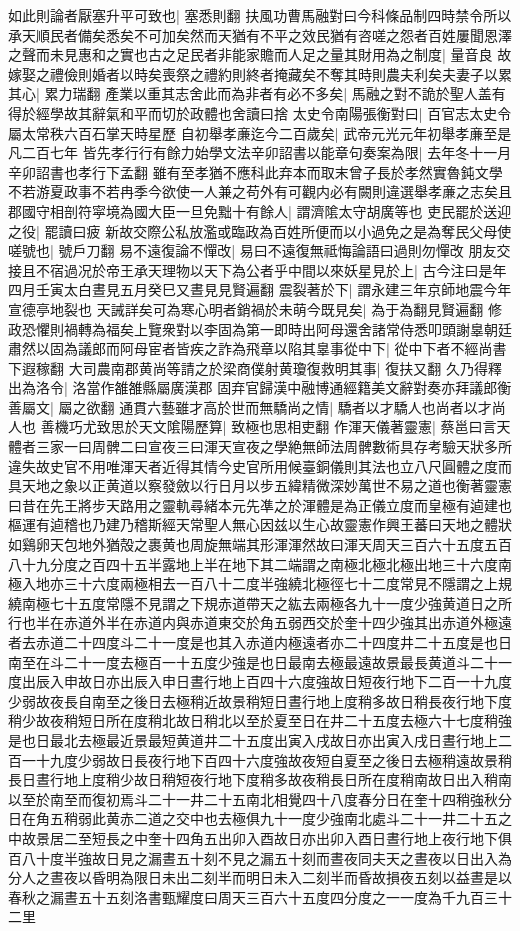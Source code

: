 如此則論者厭塞升平可致也|{
	塞悉則翻}
扶風功曹馬融對曰今科條品制四時禁令所以承天順民者備矣悉矣不可加矣然而天猶有不平之效民猶有咨嗟之怨者百姓屢聞恩澤之聲而未見惠和之實也古之足民者非能家贍而人足之量其財用為之制度|{
	量音良}
故嫁娶之禮儉則婚者以時矣喪祭之禮約則終者掩藏矣不奪其時則農夫利矣夫妻子以累其心|{
	累力瑞翻}
產業以重其志舍此而為非者有必不多矣|{
	馬融之對不詭於聖人盖有得於經學故其辭氣和平而切於政體也舍讀曰捨}
太史令南陽張衡對曰|{
	百官志太史令屬太常秩六百石掌天時星歷}
自初舉孝亷迄今二百歲矣|{
	武帝元光元年初舉孝亷至是凡二百七年}
皆先孝行行有餘力始學文法辛卯詔書以能章句奏案為限|{
	去年冬十一月辛卯詔書也孝行下孟翻}
雖有至孝猶不應科此弃本而取末曾子長於孝然實魯鈍文學不若游夏政事不若冉季今欲使一人兼之苟外有可觀内必有闕則違選舉孝亷之志矣且郡國守相剖符寜境為國大臣一旦免黜十有餘人|{
	謂濟隂太守胡廣等也}
吏民罷於送迎之役|{
	罷讀曰疲}
新故交際公私放濫或臨政為百姓所便而以小過免之是為奪民父母使嗟號也|{
	號戶刀翻}
易不遠復論不憚改|{
	易曰不遠復無祗悔論語曰過則勿憚改}
朋友交接且不宿過况於帝王承天理物以天下為公者乎中間以來妖星見於上|{
	古今注曰是年四月壬寅太白晝見五月癸巳又晝見見賢遍翻}
震裂著於下|{
	謂永建三年京師地震今年宣德亭地裂也}
天誡詳矣可為寒心明者銷禍於未萌今既見矣|{
	為于為翻見賢遍翻}
修政恐懼則禍轉為福矣上覽衆對以李固為第一即時出阿母還舍諸常侍悉叩頭謝辠朝廷肅然以固為議郎而阿母宦者皆疾之詐為飛章以陷其辠事從中下|{
	從中下者不經尚書下遐稼翻}
大司農南郡黄尚等請之於梁商僕射黄瓊復救明其事|{
	復扶又翻}
久乃得釋出為洛令|{
	洛當作雒雒縣屬廣漢郡}
固弃官歸漢中融博通經籍美文辭對奏亦拜議郎衡善屬文|{
	屬之欲翻}
通貫六藝雖才高於世而無驕尚之情|{
	驕者以才驕人也尚者以才尚人也}
善機巧尤致思於天文隂陽歷算|{
	致極也思相吏翻}
作渾天儀著靈憲|{
	蔡邕曰言天體者三家一曰周髀二曰宣夜三曰渾天宣夜之學絶無師法周髀數術具存考驗天狀多所違失故史官不用唯渾天者近得其情今史官所用候臺銅儀則其法也立八尺圓體之度而具天地之象以正黄道以察發斂以行日月以步五緯精微深妙萬世不易之道也衡著靈憲曰昔在先王將步天路用之靈軌尋緒本元先凖之於渾體是為正儀立度而皇極有逌建也樞運有逌稽也乃建乃稽斯經天常聖人無心因兹以生心故靈憲作興王蕃曰天地之體狀如鷄卵天包地外猶殻之裹黄也周旋無端其形渾渾然故曰渾天周天三百六十五度五百八十九分度之百四十五半露地上半在地下其二端謂之南極北極北極出地三十六度南極入地亦三十六度兩極相去一百八十二度半強繞北極徑七十二度常見不隱謂之上規繞南極七十五度常隱不見謂之下規赤道帶天之紘去兩極各九十一度少強黄道日之所行也半在赤道外半在赤道内與赤道東交於角五弱西交於奎十四少強其出赤道外極遠者去赤道二十四度斗二十一度是也其入赤道内極遠者亦二十四度井二十五度是也日南至在斗二十一度去極百一十五度少強是也日最南去極最遠故景最長黄道斗二十一度出辰入申故日亦出辰入申日晝行地上百四十六度強故日短夜行地下二百一十九度少弱故夜長自南至之後日去極稍近故景稍短日晝行地上度稍多故日稍長夜行地下度稍少故夜稍短日所在度稍北故日稍北以至於夏至日在井二十五度去極六十七度稍強是也日最北去極最近景最短黄道井二十五度出寅入戌故日亦出寅入戌日晝行地上二百一十九度少弱故日長夜行地下百四十六度強故夜短自夏至之後日去極稍遠故景稍長日晝行地上度稍少故日稍短夜行地下度稍多故夜稍長日所在度稍南故日出入稍南以至於南至而復初焉斗二十一井二十五南北相覺四十八度春分日在奎十四稍強秋分日在角五稍弱此黄赤二道之交中也去極俱九十一度少強南北處斗二十一井二十五之中故景居二至短長之中奎十四角五出卯入酉故日亦出卯入酉日晝行地上夜行地下俱百八十度半強故日見之漏晝五十刻不見之漏五十刻而晝夜同夫天之晝夜以日出入為分人之晝夜以昏明為限日未出二刻半而明日未入二刻半而昏故損夜五刻以益晝是以春秋之漏晝五十五刻洛書甄耀度曰周天三百六十五度四分度之一一度為千九百三十二里}
